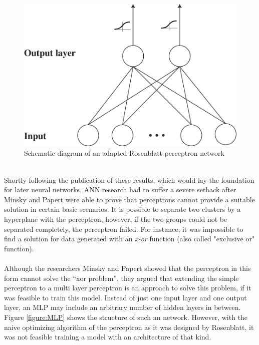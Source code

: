 \documentclass[11pt,a4paper]{article}
\begin{document}
\begin{figure}[h]
	\centering
	\includegraphics[scale=0.5]{adaption_perceptron2.pdf}
	\caption{Schematic diagram of an adapted Rosenblatt-perceptron network}
	\label{adaption_perceptron}
\end{figure}
\ \\
Shortly following the publication of these results, which would lay the foundation for later neural networks, ANN research had to suffer a severe setback after Minsky and Papert \cite{Minsky1969} were able to prove that perceptrons cannot provide a suitable solution in certain basic scenarios. It is possible to separate two clusters by a hyperplane with the perceptron, however, if the two groups could not be separated completely, the perceptron failed. For instance, it was impossible to find a solution for data generated with an \textit{x-or} function (also called "exclusive or" function).\\
\ \\
Although the researchers Minsky and Papert showed that the perceptron in this form cannot solve the “xor problem”, they argued that extending the simple perceptron to a multi layer perceptron is an approach to solve this problem, if it was feasible to train this model. Instead of just one input layer and one output layer, an MLP may include an arbitrary number of hidden layers in between. Figure \ref{figure:MLP} shows the structure of such an network. However, with the naive optimizing algorithm of the perceptron as it was designed by Rosenblatt, it was not feasible training a model with an architecture of that kind.\\
\end{document}
